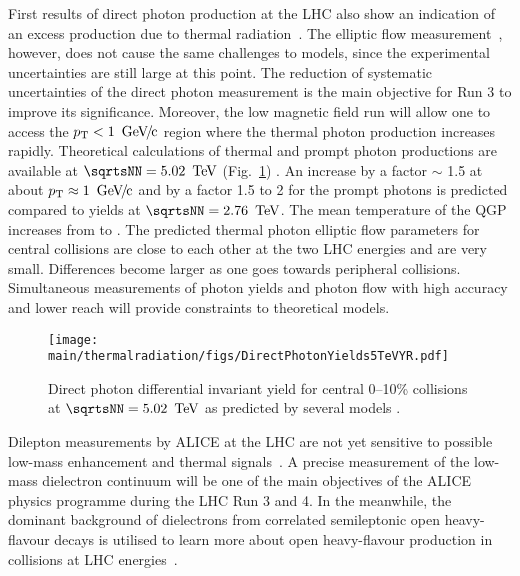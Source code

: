 \documentclass[../report.tex]{subfiles}
\providecommand{\main}{..}
\begin{document}
First results of direct photon production at the LHC also show an indication of an excess production due to thermal radiation~\cite{Adam:2015lda}. The elliptic flow measurement~\cite{Acharya:2018bdy}, however, does not cause the same challenges to models, since the experimental uncertainties are still large at this point.
The reduction of systematic uncertainties of the direct photon measurement is the main objective for Run 3 to improve its significance. Moreover, the low magnetic field run will allow one to access the $\pT < \unit[1]{\UGeVc}$ region where the thermal photon production increases rapidly. Theoretical calculations of thermal and prompt photon productions are available at $\sqrtsNN = \unit[5.02]{\UTeV}$ (Fig.~\ref{fig:LHCExpectations_RealPhotons}) \cite{Paquet:2015lta,Paquet:2016ime,Paquet:2017wji,Dasgupta:2018pjm,vanHees:2014ida}. An increase by a factor $\sim$ 1.5 at about $\pT \approx \unit[1]{\UGeVc}$ and by a factor 1.5 to 2 for the prompt photons is predicted compared to yields at $\sqrtsNN = \unit[2.76]{\UTeV}$. The mean temperature of the QGP increases from \unit[650]{\UMeV} to \unit[690]{\UMeV} \cite{Dasgupta:2018pjm}. The predicted thermal photon elliptic flow parameters for central collisions are close to each other at the two LHC energies  and are very small. Differences become larger as one goes towards peripheral collisions. Simultaneous measurements of photon yields and photon flow with high accuracy and lower \pT{} reach will provide constraints to theoretical models.
\begin{figure}[htb]
\centering
\texttt{[image: \\main/thermalradiation/figs/DirectPhotonYields5TeVYR.pdf]}
\caption{Direct photon differential invariant yield for central 0--10\% \PbPb{} collisions at $\sqrtsNN = \unit[5.02]{\UTeV}$ as predicted by several models \cite{Paquet:2015lta,Paquet:2016ime,Paquet:2017wji,Dasgupta:2018pjm,vanHees:2014ida}.}
\label{fig:LHCExpectations_RealPhotons}
\end{figure}


Dilepton measurements by ALICE at the LHC are not yet sensitive to possible low-mass enhancement and thermal signals~\cite{Acharya:2018nxm}. A precise measurement of the low-mass dielectron continuum will be one of the main objectives of the ALICE physics programme during the LHC Run 3 and 4. In the meanwhile, the dominant background of dielectrons from correlated semileptonic open heavy-flavour decays is utilised to learn more about open heavy-flavour production in \pp{} collisions at LHC energies~\cite{Acharya:2018ohw,Acharya:2018kkj}.
\end{document}
